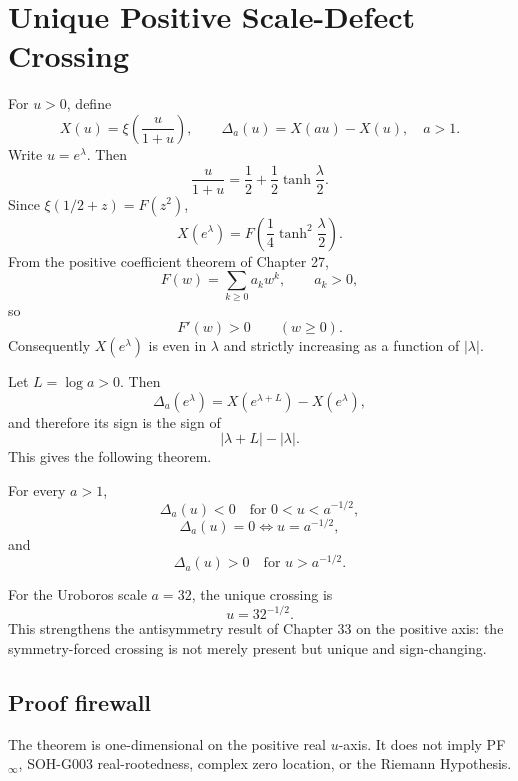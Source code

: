 \chapter{Unique Positive Scale-Defect Crossing}
\label{chap:unique-scale-defect-crossing}


For \(u>0\), define
\[
X(u)=\xi\!\left(\frac{u}{1+u}\right),\qquad
\Delta_a(u)=X(au)-X(u),\quad a>1.
\]
Write \(u=e^\lambda\). Then
\[
\frac{u}{1+u}=\frac12+\frac12\tanh\frac\lambda2.
\]
Since \(\xi(1/2+z)=F(z^2)\),
\[
\boxed{X(e^\lambda)=F\!\left(\frac14\tanh^2\frac\lambda2\right).}
\]
From the positive coefficient theorem of Chapter 27,
\[
F(w)=\sum_{k\ge0}a_k w^k,\qquad a_k>0,
\]
so
\[
F'(w)>0\qquad(w\ge0).
\]
Consequently \(X(e^\lambda)\) is even in \(\lambda\) and strictly increasing as a function of \(|\lambda|\).

Let \(L=\log a>0\). Then
\[
\Delta_a(e^\lambda)=X(e^{\lambda+L})-X(e^\lambda),
\]
and therefore its sign is the sign of
\[
|\lambda+L|-|\lambda|.
\]
This gives the following theorem.

\begin{theorem}
For every \(a>1\),
\[
\Delta_a(u)<0\quad\text{for }0<u<a^{-1/2},
\]
\[
\boxed{\Delta_a(u)=0\iff u=a^{-1/2}},
\]
and
\[
\Delta_a(u)>0\quad\text{for }u>a^{-1/2}.
\]
\end{theorem}

For the Uroboros scale \(a=32\), the unique crossing is
\[
\boxed{u=32^{-1/2}}.
\]
This strengthens the antisymmetry result of Chapter 33 on the positive axis: the symmetry-forced crossing is not merely present but unique and sign-changing.

\section{Proof firewall}
The theorem is one-dimensional on the positive real \(u\)-axis. It does not imply PF\(_\infty\), SOH-G003 real-rootedness, complex zero location, or the Riemann Hypothesis.
